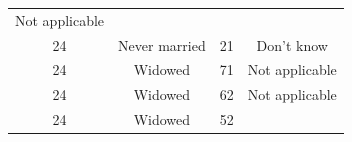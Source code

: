 \documentclass[]{tufte-book}
\begin{document}
\begin{longtable}[]{@{}cccc@{}}
\begin{minipage}[t]{0.21\columnwidth}
Not applicable\strut
\end{minipage}\tabularnewline
\begin{minipage}[t]{0.14\columnwidth}\centering\strut
24\strut
\end{minipage} & \begin{minipage}[t]{0.20\columnwidth}\centering\strut
Never married\strut
\end{minipage} & \begin{minipage}[t]{0.07\columnwidth}\centering\strut
21\strut
\end{minipage} & \begin{minipage}[t]{0.21\columnwidth}\centering\strut
Don't know\strut
\end{minipage}\tabularnewline
\begin{minipage}[t]{0.14\columnwidth}\centering\strut
24\strut
\end{minipage} & \begin{minipage}[t]{0.20\columnwidth}\centering\strut
Widowed\strut
\end{minipage} & \begin{minipage}[t]{0.07\columnwidth}\centering\strut
71\strut
\end{minipage} & \begin{minipage}[t]{0.21\columnwidth}\centering\strut
Not applicable\strut
\end{minipage}\tabularnewline
\begin{minipage}[t]{0.14\columnwidth}\centering\strut
24\strut
\end{minipage} & \begin{minipage}[t]{0.20\columnwidth}\centering\strut
Widowed\strut
\end{minipage} & \begin{minipage}[t]{0.07\columnwidth}\centering\strut
62\strut
\end{minipage} & \begin{minipage}[t]{0.21\columnwidth}\centering\strut
Not applicable\strut
\end{minipage}\tabularnewline
\begin{minipage}[t]{0.14\columnwidth}\centering\strut
24\strut
\end{minipage} & \begin{minipage}[t]{0.20\columnwidth}\centering\strut
Widowed\strut
\end{minipage} & \begin{minipage}[t]{0.07\columnwidth}\centering\strut
52\strut
\end{minipage} & \begin{minipage}[t]{0.21\columnwidth}\centering\strut

\end{minipage}
\end{longtable}
\end{document}

